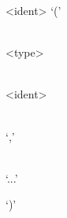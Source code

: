 \documentclass{article}
\def\H{Haskell}
\def\pend{\mbox{} \\\\}
\begin{document}

%


\begin{syntdiag}
<ident> ‘(’
\begin{rep} \begin{stack} \\
<type> \begin{stack} \\ <ident> \end{stack}
\end{stack} \\ ‘,’ \end{rep}
\begin{stack} \\ ‘...’ \end{stack} ‘)’
\end{syntdiag}
\end{document}

